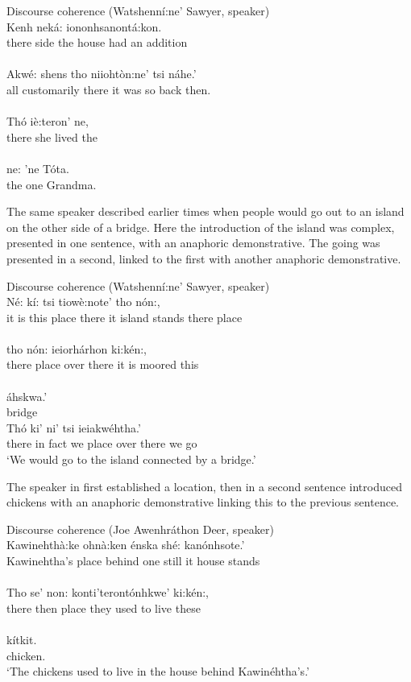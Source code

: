 \documentclass[output=paper,colorlinks,citecolor=brown]{langscibook}
\begin{document}
\ea Discourse coherence (Watshenní:ne' Sawyer, speaker)\\\label{ex:mithun:15}
\gll 
Kenh neká: iononhsanontá:kon.\\
there side {the house had an addition}\\
\medskip\\
\gll Akwé: shens      tho    niiohtòn:ne' tsi náhe.'\\
     all customarily  there {it was so}  {back then}.\\
\medskip\\
\gll Thó iè:teron'       ne,\\
     there  {she lived}  the\\
\medskip\\
\gll ne: 'ne Tóta.\\
    the one Grandma.\\
\z

The same speaker described earlier times when people would go out to an island on the other side of a bridge. Here the introduction of the island was complex, presented in one sentence, with an anaphoric demonstrative. The going was presented in a second, linked to the first with another anaphoric demonstrative.

\ea Discourse coherence (Watshenní:ne' Sawyer, speaker)\\\label{ex:mithun:16}
\gll Né: kí: tsi tiowè:note' tho nón:,\\                      
     {it is} this place {there it island stands} there place\\
\medskip\\
\gll tho nón: ieiorhárhon ki:kén:,\\    
     there place {over there it is moored} this\\    
\medskip\\
áhskwa.'\\      
bridge\medskip\\
\gll Thó  ki' ni' tsi  ieiakwéhtha.'\\
     there {in fact}  we place {over there we go}\\
\glt `We would go to the island connected by a bridge.'
\z


The speaker in  first established a location, then in a second sentence introduced chickens with an anaphoric demonstrative linking this to the previous sentence.

\ea Discourse coherence (Joe Awenhráthon Deer, speaker)\\\label{ex:mithun:17}
\gll Kawinehthà:ke ohnà:ken énska shé: kanónhsote.'\\ 
     {Kawinehtha's place} behind  one  still {it house stands}\\ 
\medskip\\
\gll Tho se' non: konti'terontónhkwe' ki:kén:,\\
there  then  place {they used to live} these  \\
\medskip\\
\gll  kítkit.\\
chicken.\\
\glt `The chickens used to live in the house behind Kawinéhtha's.'
\z
\end{document}
